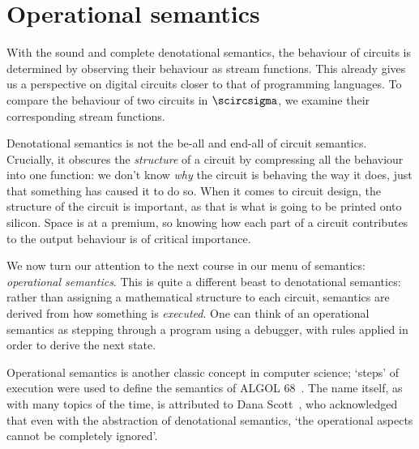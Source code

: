 \chapter{Operational semantics}\label{chap:operational}

With the sound and complete denotational semantics, the behaviour of circuits is
determined by observing their behaviour as stream functions.
This already gives us a perspective on digital circuits closer to that of
programming languages.
To compare the behaviour of two circuits in \(\scircsigma\), we examine their
corresponding stream functions.

Denotational semantics is not the be-all and end-all of circuit semantics.
Crucially, it obscures the \emph{structure} of a circuit by compressing all the
behaviour into one function: we don't know \emph{why} the circuit is behaving
the way it does, just that something has caused it to do so.
When it comes to circuit design, the structure of the circuit is important, as
that is what is going to be printed onto silicon.
Space is at a premium, so knowing how each part of a circuit contributes to the
output behaviour is of critical importance.

We now turn our attention to the next course in our menu of semantics:
\emph{operational semantics}.
This is quite a different beast to denotational semantics: rather than assigning
a mathematical structure to each circuit, semantics are derived from how
something is \emph{executed}.
One can think of an operational semantics as stepping through a
program using a debugger, with rules applied in order to derive the next state.

Operational semantics is another classic concept in computer science; `steps' of
execution were used to define the semantics of ALGOL
68~\cite{vanwijngaarden1976revised}.
The name itself, as with many topics of the time, is attributed to Dana
Scott~\cite{scott1970outline}, who acknowledged that even with the abstraction
of denotational semantics, `the operational aspects cannot be completely
ignored'.

